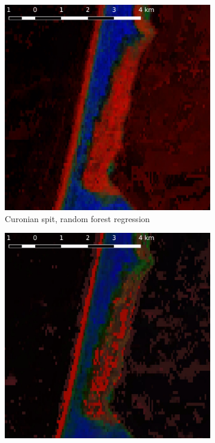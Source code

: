 \documentclass[a4paper,12pt]{scrbook}
\begin{document}
\begin{figure}
\begin{subfigure}[t]{.23\textwidth}
    \includegraphics[width=\textwidth]{thesis-figures/figures-qgis/kursiunerija-rf}
    \caption{Curonian spit, random forest regression}
    \label{subfig-kursiunerija-rf}
  \end{subfigure} \hfill
  \begin{subfigure}[t]{.23\textwidth}
    \includegraphics[width=\textwidth]{thesis-figures/figures-qgis/kursiunerija-nn}

\end{subfigure}
\end{figure}
\end{document}
